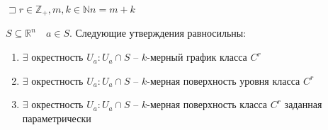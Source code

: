 \documentclass{book}
\newcommand\N{\ensuremath{\mathbb{N}}}
\newcommand\R{\ensuremath{\mathbb{R}}}
\newcommand\Z{\ensuremath{\mathbb{Z}}}
\theoremstyle{definition}
\begin{document}
\begin{theorem}

    $\sqsupset r\in \Z _+, m, k\in \N  n = m+k$

    $S \subseteq \R^n\quad a\in S$. Следующие утверждения равносильны:
    \begin{enumerate}
        \item $\exists$ окрестность $U_a: U_a \cap S$ -- $k$-мерный график класса  $C^r$
        \item  $\exists $ окрестность $U_a: U_a\cap S$ -- $k$-мерная поверхность уровня класса  $C^r$
        \item  $\exists $ окрестность $U_a: U_a\cap S$ -- $k$-мерная поверхность класса  $C^r$ заданная параметрически
    \end{enumerate}
\end{theorem}
\end{document}
